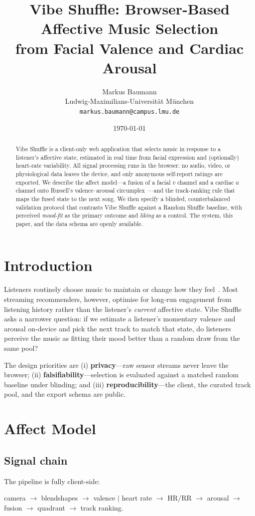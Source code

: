 \documentclass[11pt]{article}
\title{\textbf{Vibe Shuffle: Browser-Based Affective Music Selection\\
from Facial Valence and Cardiac Arousal}}
\author{Markus Baumann\\
\small Ludwig-Maximilians-Universit\"at M\"unchen\\
\small \texttt{markus.baumann@campus.lmu.de}}
\date{\today}
\newcommand{\valence}{\ensuremath{v}}
\newcommand{\arousal}{\ensuremath{a}}
\begin{document}
\maketitle

\begin{abstract}
\noindent
Vibe Shuffle is a client-only web application that selects music in response to
a listener's affective state, estimated in real time from facial expression and
(optionally) heart-rate variability. All signal processing runs in the browser:
no audio, video, or physiological data leaves the device, and only anonymous
self-report ratings are exported. We describe the affect model---a fusion of a
facial \valence{} channel and a cardiac \arousal{} channel onto Russell's
valence--arousal circumplex~\cite{russell1980}---and the track-ranking rule that
maps the fused state to the next song. We then specify a blinded,
counterbalanced validation protocol that contrasts Vibe Shuffle against a Random
Shuffle baseline, with perceived \emph{mood-fit} as the primary outcome and
\emph{liking} as a control. The system, this paper, and the data schema are
openly available.
\end{abstract}

\section{Introduction}
Listeners routinely choose music to maintain or change how they
feel~\cite{juslin2008}. Most streaming recommenders, however, optimise for
long-run engagement from listening history rather than the listener's
\emph{current} affective state. Vibe Shuffle asks a narrower question: if we
estimate a listener's momentary valence and arousal on-device and pick the next
track to match that state, do listeners perceive the music as fitting their mood
better than a random draw from the same pool?

The design priorities are (i) \textbf{privacy}---raw sensor streams never leave
the browser; (ii) \textbf{falsifiability}---selection is evaluated against a
matched random baseline under blinding; and (iii) \textbf{reproducibility}---the
client, the curated track pool, and the export schema are public.

\section{Affect Model}

\subsection{Signal chain}
The pipeline is fully client-side:
\begin{center}
\small
camera $\rightarrow$ blendshapes $\rightarrow$ valence \quad$\big|$\quad
heart rate $\rightarrow$ HR/RR $\rightarrow$ arousal \quad$\rightarrow$\quad
fusion $\rightarrow$ quadrant $\rightarrow$ track ranking.
\end{center}
\end{document}
